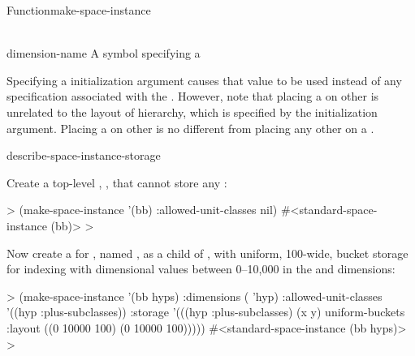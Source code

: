 \documentclass[10pt,twoside,english,pdftex]{article}
\begin{document}
\begin{functiondoc}{Function}{make-space-instance}{
      \\ 
      \\
    \returns{} }
\fnterms
\begin{args}{dimension-name}
 A symbol specifying a  
\end{args}

\fndescription 
%
%
%
%
Specifying a  initialization argument
causes that value to be used instead of any 
specification associated with the .  However, note that
placing a  on other  is unrelated
to the layout of  hierarchy, which is specified
by the  initialization argument.  Placing a
 on other  is no different from
placing any other  on a .

\begin{alsos}{describe-space-instance-storage}
\also[children-of]
\also[dimensions-of]
\also[parent-of]
\end{alsos}

\fnexamples
Create a top-level , ,
that cannot store any :
%
\W\supp
\begin{example}
  > (make-space-instance '(bb) 
       :allowed-unit-classes nil)
  #<standard-space-instance (bb)>
  > 
\end{example}
%
%
%
Now create a  for  ,
named , as a child of , with uniform, 100-wide, bucket
storage for indexing  with dimensional values between 
0--10,000 in the  and  dimensions:
%
\W\supp\notpretop
\begin{example}
  > (make-space-instance '(bb hyps)
       :dimensions ( 'hyp)
       :allowed-unit-classes '((hyp :plus-subclasses))
       :storage '(((hyp :plus-subclasses) (x y) 
                   uniform-buckets :layout ((0 10000 100)
                                            (0 10000 100)))))
  #<standard-space-instance (bb hyps)>
  >
\end{example}


\end{functiondoc}
\end{document}
